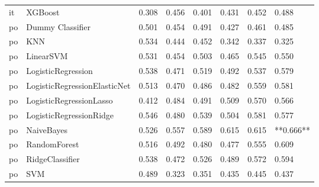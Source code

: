 \begin{tabular}{llllllll}
      it &                      XGBoost & 0.308 &                     0.456 &                 0.401 &                  0.431 &                                   0.452 &     0.488 \\
      po &             Dummy Classifier & 0.501 &                     0.454 &                 0.491 &                  0.427 &                                   0.461 &     0.485 \\
      po &                          KNN & 0.534 &                     0.444 &                 0.452 &                  0.342 &                                   0.337 &     0.325 \\
      po &                    LinearSVM & 0.531 &                     0.454 &                 0.503 &                  0.465 &                                   0.545 &     0.550 \\
      po &           LogisticRegression & 0.538 &                     0.471 &                 0.519 &                  0.492 &                                   0.537 &     0.579 \\
      po & LogisticRegressionElasticNet & 0.513 &                     0.470 &                 0.486 &                  0.482 &                                   0.559 &     0.581 \\
      po &      LogisticRegressionLasso & 0.412 &                     0.484 &                 0.491 &                  0.509 &                                   0.570 &     0.566 \\
      po &      LogisticRegressionRidge & 0.546 &                     0.480 &                 0.539 &                  0.504 &                                   0.581 &     0.577 \\
      po &                   NaiveBayes & 0.526 &                     0.557 &                 0.589 &                  0.615 &                                   0.615 & **0.666** \\
      po &                 RandomForest & 0.516 &                     0.492 &                 0.480 &                  0.477 &                                   0.555 &     0.609 \\
      po &              RidgeClassifier & 0.538 &                     0.472 &                 0.526 &                  0.489 &                                   0.572 &     0.594 \\
      po &                          SVM & 0.489 &                     0.323 &                 0.351 &                  0.435 &                                   0.445 &     0.437 \\

\end{tabular}
